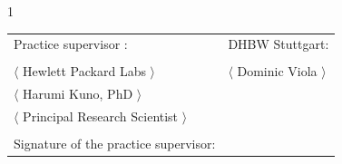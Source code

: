 \begin{spacing}{1}
    \begin{tabular}{ll}
        Practice supervisor :                    & DHBW Stuttgart:                   \\
        \hspace{0.4\linewidth}                   &                                   \\
        $\langle$ Hewlett Packard Labs $\rangle$ & $\langle$ Dominic Viola $\rangle$ \\
        $\langle$ Harumi Kuno, PhD $\rangle$
                                                 &                                   \\
        $\langle$ Principal Research Scientist $\rangle$                             \\
        \\
        Signature of the practice supervisor:                                        \\
    \end{tabular}


    \vspace{1cm}
\end{spacing}



